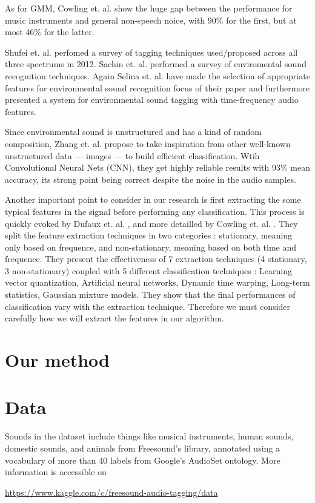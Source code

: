 \documentclass{article} %
\begin{document}
    As for GMM, Cowling et. al. \cite{cite1} show the huge gap between the performance for music instruments and general non-speech noice, with 90\% for the first, but at most 46\% for the latter.
    
    Shufei et. al. \cite{cite5} perfomed a survey of tagging techniques used/proposed across all three spectrums in 2012. Sachin et. al. \cite{cite6} performed a survey of enviromental sound recognition techniques. Again Selina et. al. \cite{cite7} have made the selection of appropriate features for environmental sound recognition focus of their paper and furthermore presented \cite{cite8} a system for environmental sound tagging with time-frequency audio features.

    Since environmental sound is unstructured and has a kind of random composition, Zhang et. al. \cite{cite2} propose to take inspiration from other well-known unstructured data --- images --- to build efficient classification. Wtih Convolutional Neural Nets (CNN), they get highly reliable results with 93\% mean accuracy, its strong point being correct despite the noise in the audio samples.

    Another important point to consider in our research is first extracting the some typical features in the signal before performing any classification. This process is quickly evoked by Dufaux et. al. \cite{cite3}, and more detailled by Cowling et. al. \cite{cite1}. They split the feature extraction techniques in two categories : stationary, meaning only based on frequence, and non-stationary, meaning based on both time and frequence. They present the effectiveness of 7 extraction techniques (4 stationary, 3 non-stationary) coupled with 5 different classification techniques : Learning vector quantization, Artificial neural networks, Dynamic time warping, Long-term statistics, Gaussian mixture models. They show that the final performances of classification vary with the extraction technique. Therefore we must consider carefully how we will extract the features in our algorithm.

\section{Our method}

\section{Data}
	Sounds in the dataset include things like musical instruments, human sounds, domestic sounds, and animals from Freesound’s library, annotated using a vocabulary of more than 40 labels from Google’s AudioSet ontology. 
	More information is accessible on 
	\begin{center} 
	\url{https://www.kaggle.com/c/freesound-audio-tagging/data}
	\end{center}
\end{document}
